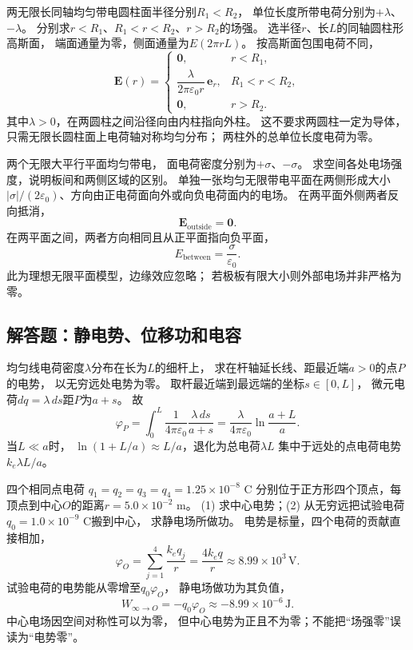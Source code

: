 \problemtext 两无限长同轴均匀带电圆柱面半径分别$R_1<R_2$，
单位长度所带电荷分别为$+\lambda$、$-\lambda$。
分别求$r<R_1$、$R_1<r<R_2$、$r>R_2$的场强。
\workings
选半径$r$、长$L$的同轴圆柱形高斯面，
端面通量为零，侧面通量为$E(2\pi rL)$。
按高斯面包围电荷不同，
\[
\boxed{\bm E(r)=
\begin{cases}
\bm0,&r<R_1,\\
\dfrac{\lambda}{2\pi\varepsilon_0 r}\,\bm e_r,&R_1<r<R_2,\\
\bm0,&r>R_2.
\end{cases}}
\]
其中$\lambda>0$，在两圆柱之间沿径向由内柱指向外柱。
\crosscheck 这不要求两圆柱一定为导体，只需无限长圆柱面上电荷轴对称均匀分布；
两柱外的总单位长度电荷为零。

\problemtext 两个无限大平行平面均匀带电，
面电荷密度分别为$+\sigma$、$-\sigma$。
求空间各处电场强度，说明板间和两侧区域的区别。
\workings
单独一张均匀无限带电平面在两侧形成大小
$|\sigma|/(2\varepsilon_0)$、方向由正电荷面向外或向负电荷面内的电场。
在两平面外侧两者反向抵消，
\[
\boxed{\bm E_{\mathrm{outside}}=\bm0}.
\]
在两平面之间，两者方向相同且从正平面指向负平面，
\[
\boxed{E_{\mathrm{between}}=\frac{\sigma}{\varepsilon_0}}.
\]
\crosscheck 此为理想无限平面模型，边缘效应忽略；
若极板有限大小则外部电场并非严格为零。

\subsection{解答题：静电势、位移功和电容}

\problemtext 均匀线电荷密度$\lambda$分布在长为$L$的细杆上，
求在杆轴延长线、距最近端$a>0$的点$P$的电势，
以无穷远处电势为零。
\workings
取杆最近端到最远端的坐标$s\in[0,L]$，
微元电荷$dq=\lambda\,ds$距$P$为$a+s$。
故
\[
\varphi_P=\int_0^L\frac1{4\pi\varepsilon_0}
\frac{\lambda\,ds}{a+s}
=\boxed{\frac{\lambda}{4\pi\varepsilon_0}
\ln\frac{a+L}{a}}.
\]
\crosscheck 当$L\ll a$时，
$\ln(1+L/a)\approx L/a$，退化为总电荷$\lambda L$
集中于远处的点电荷电势$k_e\lambda L/a$。

\problemtext 四个相同点电荷
$q_1=q_2=q_3=q_4=1.25\times10^{-8}$ C
分别位于正方形四个顶点，每顶点到中心$O$的距离$r=5.0\times10^{-2}$ m。
(1) 求中心电势；(2) 从无穷远把试验电荷$q_0=1.0\times10^{-9}$ C搬到中心，
求静电场所做功。
\workings
电势是标量，四个电荷的贡献直接相加，
\[
\boxed{\varphi_O=\sum_{j=1}^4\frac{k_eq_j}{r}
=\frac{4k_eq}{r}
\approx8.99\times10^3\,\mathrm V}.
\]
试验电荷的电势能从零增至$q_0\varphi_O$，
静电场做功为其负值，
\[
\boxed{W_{\infty\to O}=-q_0\varphi_O
\approx-8.99\times10^{-6}\,\mathrm J}.
\]
\crosscheck 中心电场因空间对称性可以为零，
但中心电势为正且不为零；不能把“场强零”误读为“电势零”。

